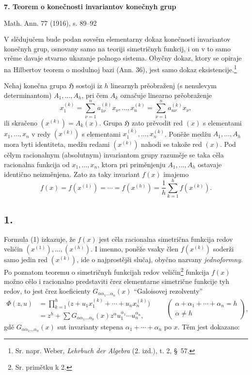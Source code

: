 \documentclass[11pt]{article}
\providecommand{\Hgrp}{\mathfrak{H}}
\begin{document}
\begin{center}
{\Large\bfseries 7. Teorem o konečnosti invariantov konečnyh grup}\par
\vspace{1.2em}
Math. Ann. 77 (1916), s. 89--92
\end{center}

\vspace{1em}

V slědujučem bude podan sovsěm elementarny dokaz konečnosti invariantov konečnyh grup, osnovany samo na teoriji simetričnyh funkcij, i on v to samo vrěme davaje stvarno ukazanje polnogo sistema. Obyčny dokaz, ktory se opiraje na Hilbertov teorem o modulnoj bazi (Ann. 36), jest samo dokaz eksistencije.\footnote{Sr. napr. Weber, \emph{Lehrbuch der Algebra} (2. izd.), t. 2, \S\ 57.}

Nehaj konečna grupa $\Hgrp$ sostoji iz $h$ linearnyh prěobraženj (s nenulevym determinantom) $A_1,\ldots,A_h$, pri čem $A_k$ označuje linearno prěobraženje
\[
  x_1^{(k)}=\sum_{\nu=1}^{n}a_{1\nu}^{(k)}x_\nu,\ldots,
  x_n^{(k)}=\sum_{\nu=1}^{n}a_{n\nu}^{(k)}x_\nu,
\]
ili skračeno $(x^{(k)})=A_k(x)$. Grupa $\Hgrp$ zato prěvodit red $(x)$ s elementami $x_1,\ldots,x_n$ v redy $(x^{(k)})$ s elementami $x_1^{(k)},\ldots,x_n^{(k)}$. Poněže medžu $A_1,\ldots,A_h$ mora byti identiteta, medžu redami $(x^{(k)})$ nahodi se takože red $(x)$. Pod cělym racionalnym (absolutnym) invariantom grupy razuměje se taka cěla racionalna funkcija od $x_1,\ldots,x_n$, ktora pri priměnjenju $A_1,\ldots,A_h$ ostavaje identično neizměnjena. Zato za taky invariant $f(x)$ imajemo
\begin{equation}
  f(x)=f(x^{(1)})=\cdots=f(x^{(h)})=
  \frac1h\sum_{k=1}^{h}f(x^{(k)}).
\tag{1}
\end{equation}

\subsection*{1.}
Formula (1) izkazuje, že $f(x)$ jest cěla racionalna simetrična funkcija redov veličin $(x^{(1)}),\ldots,(x^{(h)})$. I imenno, poněže vsaky člen $f(x^{(k)})$ soderži samo jedin red $(x^{(k)})$, ide o najprostějši slučaj, obyčno nazvany {\itshape jednoformny}. Po poznatom teoremu o simetričnyh funkcijah redov veličin\footnote{Sr. primětku k 2.} funkcija $f(x)$ možno cělo i racionalno predstaviti črez elementarne simetrične funkcije tyh redov, to jest črez koeficienty $G_{\alpha\alpha_1\ldots\alpha_n}(x)$ ``Galoisovej rezolventy''
\[
\begin{aligned}
  \Phi(z,u)
  &=\prod_{k=1}^{h}\bigl(z+u_1x_1^{(k)}+\cdots+u_nx_n^{(k)}\bigr) \\
  &=z^h+
    \sum G_{\alpha\alpha_1\ldots\alpha_n}(x)
    z^{\alpha}u_1^{\alpha_1}\cdots u_n^{\alpha_n},
\end{aligned}
\qquad
\left(\begin{array}{c}
\alpha+\alpha_1+\cdots+\alpha_n=h\\
\alpha\ne h
\end{array}\right),
\]
gdě $G_{\alpha\alpha_1\ldots\alpha_n}(x)$ sut invarianty stepena $\alpha_1+\cdots+\alpha_n$ po $x$. Těm jest dokazano:
\end{document}
